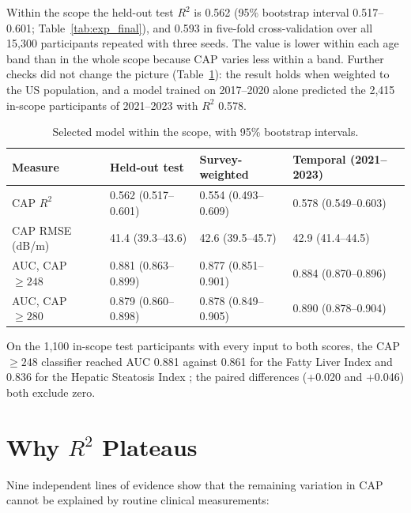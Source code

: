 Within the scope the held-out test $R^2$ is 0.562 (95\% bootstrap interval
0.517--0.601; Table~\ref{tab:exp_final}), and 0.593 in five-fold
cross-validation over all 15,300 participants repeated with three seeds. The
value is lower within each age band than in the whole scope because CAP
varies less within a band. Further checks did not change the picture
(Table~\ref{tab:exp_validation}): the result holds when weighted to the US
population, and a model trained on 2017--2020 alone predicted the 2,415
in-scope participants of 2021--2023 with $R^2$ 0.578.

\begin{table}[htbp]
\centering
\caption{Selected model within the scope, with 95\% bootstrap intervals.}
\label{tab:exp_validation}
\begin{tabular}{p{4.2cm}p{3.2cm}p{3.2cm}p{3.2cm}}
\toprule
Measure & Held-out test & Survey-weighted & Temporal (2021--2023) \\
\midrule
CAP $R^2$ & 0.562 (0.517--0.601) & 0.554 (0.493--0.609) & 0.578 (0.549--0.603) \\
CAP RMSE (dB/m) & 41.4 (39.3--43.6) & 42.6 (39.5--45.7) & 42.9 (41.4--44.5) \\
AUC, CAP $\geq 248$ & 0.881 (0.863--0.899) & 0.877 (0.851--0.901) & 0.884 (0.870--0.896) \\
AUC, CAP $\geq 280$ & 0.879 (0.860--0.898) & 0.878 (0.849--0.905) & 0.890 (0.878--0.904) \\
\bottomrule
\end{tabular}
\end{table}

On the 1,100 in-scope test participants with every input to both scores, the
CAP $\geq 248$ classifier reached AUC 0.881 against 0.861 for the Fatty Liver
Index \cite{bedogni2006fli} and 0.836 for the Hepatic Steatosis Index
\cite{lee2010hsi}; the paired differences (+0.020 and +0.046) both exclude
zero.

\section{Why $R^2$ Plateaus}
\label{sec:exp_plateau}

Nine independent lines of evidence show that the remaining variation in CAP
cannot be explained by routine clinical measurements:


